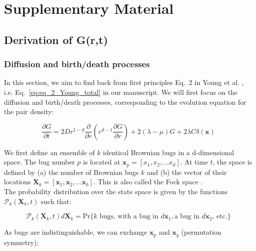 \section*{Supplementary Material}

\subsection*{Derivation of G(r,t)}

\subsubsection*{Diffusion and birth/death processes}

In this section, we aim to find back from first principles Eq.~2 in Young et al. \cite{young_reproductive_2001}, i.e. Eq.~\ref{eq:eq_2_Young_total} in our manuscript. We will first focus on the diffusion and birth/death processes, corresponding to the evolution equation for the pair density:

\begin{equation}
 \frac{\partial G}{\partial t}=2Dr^{1-d}\frac{\partial}{\partial r}\left(r^{d-1}\frac{\partial G}{\partial r}\right)+2(\lambda-\mu)G+2\lambda C\delta(\boldsymbol{x})\label{eq:eq_2_Young_diffusionbirth}
\end{equation}

\vspace{1.25em}

We first define an ensemble of $k$ identical Brownian bugs in a d-dimensional space. The bug number $p$ is located at $\boldsymbol{x}_{p}=[x_1,x_2,...x_{d}]$. At time $t$, the space is defined by (a) the number of Brownian
bugs $k$ and (b) the vector of their locations $\boldsymbol{X}_{k}=[\boldsymbol{x}_{1},\boldsymbol{x}_{2},...\boldsymbol{x}_{k}]$. This is also called the Fock space \citep{birch_master_2006}.\\

The probability distribution over the state space is given by the functions $\mathcal{P}_{k}(\boldsymbol{X}_{k},t)$ such that:

\begin{equation}
\mathcal{P}_{k}(\boldsymbol{X}_{k},t)d\boldsymbol{X}_{k}=\text{Pr}\{k\text{ bugs, with a bug in }d\boldsymbol{x}_{1},\text{a bug in }d\boldsymbol{x}_{2}\text{, etc.}\}
\end{equation}

\vspace{1.25em}

As bugs are indistinguishable, we can exchange $\boldsymbol{x}_{p}$
and $\boldsymbol{x}_{q}$ (permutation symmetry):

